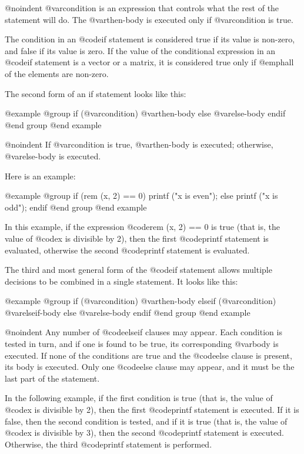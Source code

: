 @noindent
@var{condition} is an expression that controls what the rest of the
statement will do.  The @var{then-body} is executed only if
@var{condition} is true.

The condition in an @code{if} statement is considered true if its value
is non-zero, and false if its value is zero.  If the value of the
conditional expression in an @code{if} statement is a vector or a
matrix, it is considered true only if @emph{all} of the elements are
non-zero.

The second form of an if statement looks like this:

@example
@group
if (@var{condition})
  @var{then-body}
else
  @var{else-body}
endif
@end group
@end example

@noindent
If @var{condition} is true, @var{then-body} is executed; otherwise,
@var{else-body} is executed.

Here is an example:

@example
@group
if (rem (x, 2) == 0)
  printf ("x is even\n");
else
  printf ("x is odd\n");
endif
@end group
@end example

In this example, if the expression @code{rem (x, 2) == 0} is true (that
is, the value of @code{x} is divisible by 2), then the first
@code{printf} statement is evaluated, otherwise the second @code{printf}
statement is evaluated.

The third and most general form of the @code{if} statement allows
multiple decisions to be combined in a single statement.  It looks like
this:

@example
@group
if (@var{condition})
  @var{then-body}
elseif (@var{condition})
  @var{elseif-body}
else
  @var{else-body}
endif
@end group
@end example

@noindent
Any number of @code{elseif} clauses may appear.  Each condition is
tested in turn, and if one is found to be true, its corresponding
@var{body} is executed.  If none of the conditions are true and the
@code{else} clause is present, its body is executed.  Only one
@code{else} clause may appear, and it must be the last part of the
statement.

In the following example, if the first condition is true (that is, the
value of @code{x} is divisible by 2), then the first @code{printf}
statement is executed.  If it is false, then the second condition is
tested, and if it is true (that is, the value of @code{x} is divisible
by 3), then the second @code{printf} statement is executed.  Otherwise,
the third @code{printf} statement is performed.

